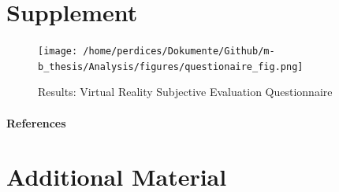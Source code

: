 \documentclass[12pt,oneside,openright]{report}
\begin{document}
\newpage
\section*{Supplement}
    \begin{figure}[H]
        \centering
        \texttt{[image: /home/perdices/Dokumente/Github/m-b\_thesis/Analysis/figures/questionaire\_fig.png]}
        \caption{Results: Virtual Reality Subjective Evaluation Questionnaire}
        \label{fig:quest}
    \end{figure}
\pagebreak



\paragraph{\textbf{References}}
\printbibliography[heading=none]


\pagebreak
\vspace*{\fill}
\section*{\centering Additional Material}
\vspace*{\fill}
\end{document}

